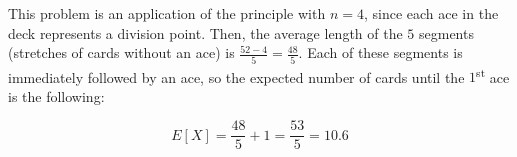\documentclass{article}
\begin{document}
This problem is an application of the principle with $n=4$, since each 
ace in the deck represents a division point. Then, the average length 
of the $5$ segments (stretches of cards without an ace) is 
$\frac{52-4}{5} = \frac{48}{5}$. Each of these segments is immediately 
followed by an ace, so the expected number of cards until the 
$1$\textsuperscript{st} ace is the following:

$$E[X] = \frac{48}{5} + 1 = \frac{53}{5} = 10.6$$
\end{document}
